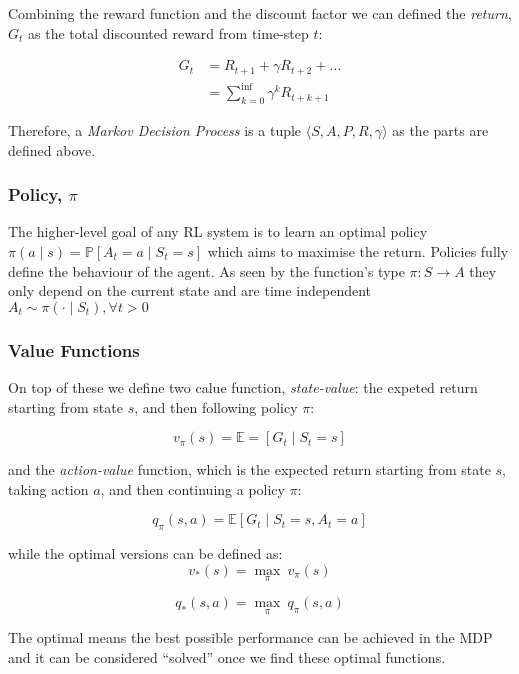     Combining the reward function and the discount factor we can defined the \emph{return}, $G_t$ as the total discounted reward from time-step $t$:

    \[ 
    \begin{aligned}
      G_t &= R_{t+1} + \gamma R_{t+2} + \ldots \\ 
      &= \sum_{k=0}^{\inf}\gamma^k R_{t+k+1} 
    \end{aligned}
    \]
    
    Therefore, a \emph{Markov Decision Process} is a tuple \(\langle S, A, P, R, \gamma \rangle\) as the parts are defined above.
    
    
  \subsubsection{Policy, $\pi$}
    The higher-level goal of any RL system is to learn an optimal policy \(\pi \left( a \mid s\right) = \mathbb{P} \left[A_t = a \mid S_t = s\right]\) which aims to maximise the return. Policies fully define the behaviour of the agent. As seen by the function's type \(\pi: S \rightarrow A \) they only depend on the current state and are time independent \( A_t \sim \pi\left( \cdot \mid S_t\right), \forall t > 0 \)
    
  \subsubsection{Value Functions}
    On top of these we define two calue function, \emph{state-value}: the expeted return starting from state $s$, and then following policy $\pi$:

    \[ v_\pi \left(s\right) = \mathbb{E} = \left[G_t \mid S_t = s\right]\]

    and the \emph{action-value} function, which is the expected return starting from state $s$, taking action $a$, and then continuing a policy $\pi$:

    \[ q_\pi \left(s, a\right) = \mathbb{E} \left[ G_t \mid S_t = s, A_t = a\right]\]


    while the optimal versions can be defined as:
    \[v_* \left(s\right) = \underset{\pi}{\max} \ v_\pi \left(s\right)\]

    \[q_* \left(s, a\right) = \underset{\pi}{\max} \ q_\pi \left(s, a\right)\]
    
    The optimal means the best possible performance can be achieved in the MDP and it can be considered ``solved'' once we find these optimal functions.

